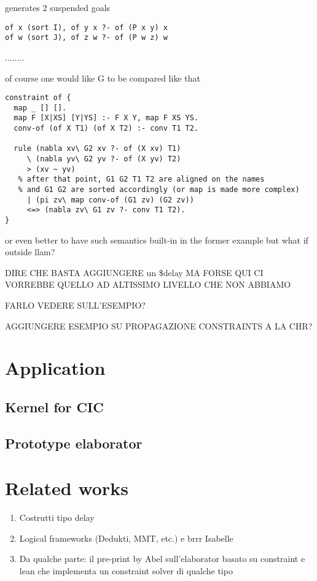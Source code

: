 \documentclass{easychair}
\begin{document}
generates 2 suspended goals

\begin{verbatim}
of x (sort I), of y x ?- of (P x y) x
of w (sort J), of z w ?- of (P w z) w
\end{verbatim}

........

of course one would like G to be compared like that

\begin{verbatim}
constraint of {
  map _ [] [].
  map F [X|XS] [Y|YS] :- F X Y, map F XS YS.
  conv-of (of X T1) (of X T2) :- conv T1 T2.

  rule (nabla xv\ G2 xv ?- of (X xv) T1)
     \ (nabla yv\ G2 yv ?- of (X yv) T2)
     > (xv ~ yv)
   % after that point, G1 G2 T1 T2 are aligned on the names
   % and G1 G2 are sorted accordingly (or map is made more complex)
     | (pi zv\ map conv-of (G1 zv) (G2 zv))
     <=> (nabla zv\ G1 zv ?- conv T1 T2).
}
\end{verbatim}

or even better to have such semantics built-in in the former example
but what if outside llam?


DIRE CHE BASTA AGGIUNGERE un \$delay MA FORSE QUI CI VORREBBE QUELLO AD ALTISSIMO LIVELLO CHE NON ABBIAMO

FARLO VEDERE SULL'ESEMPIO?

AGGIUNGERE ESEMPIO SU PROPAGAZIONE CONSTRAINTS A LA CHR?

\section{Application}

\subsection{Kernel for CIC}



\subsection{Prototype elaborator}


\section{Related works}
\begin{enumerate}
\item Costrutti tipo delay
\item Logical frameworks (Dedukti, MMT, etc.) e brrr Isabelle
\item Da qualche parte: il pre-print by Abel sull'elaborator basato su
 constraint e lean che implementa un constraint solver di qualche tipo
\end{enumerate}
\end{document}
